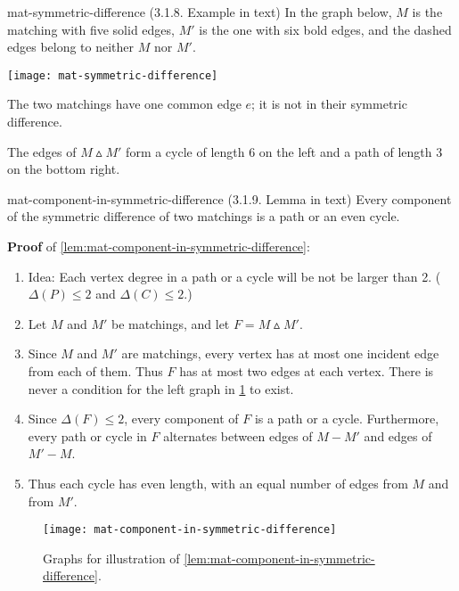 \documentclass[../src/handouts/main.tex]{subfiles}
\begin{document}
\begin{example}{}{mat-symmetric-difference}
  (3.1.8. Example in text)
  In the graph below, $M$ is the matching with five solid edges, $M'$ is the one with six bold edges, and the dashed edges belong to neither $M$ nor $M'$.

  \begin{center}
    \texttt{[image: mat-symmetric-difference]}
  \end{center}

  The two matchings have one common edge $e$; it is not in their symmetric difference.

  The edges of $M \smalltriangleup M'$ form a cycle of length 6 on the left and a path of length 3 on the bottom right.
\end{example}

\begin{lemma}{}{mat-component-in-symmetric-difference}
  (3.1.9. Lemma in text)
  Every component of the symmetric difference of two matchings is a path or an even cycle.
\end{lemma}

\textbf{Proof} of \cref{lem:mat-component-in-symmetric-difference}:
\begin{enumerate}
  \item Idea: Each vertex degree in a path or a cycle will be not be larger than 2. ($\Delta(P) \leq 2$ and $\Delta(C) \leq 2$.)
  \item Let $M$ and $M'$ be matchings, and let $F = M \smalltriangleup M'$.
  \item Since $M$ and $M'$ are matchings, every vertex has at most one incident edge from each of them. Thus $F$ has at most two edges at each vertex. There is never a condition for the left graph in \cref{fig:mat-component-in-symmetric-difference} to exist.
  \item Since $\Delta(F) \leq 2$, every component of $F$ is a path or a cycle. Furthermore, every path or cycle in $F$ alternates between edges of $M - M'$ and edges of $M' - M$.
  \item Thus each cycle has even length, with an equal number of edges from $M$ and from $M'$.
\end{enumerate}

\begin{figure}[htbp]
  \centering
  \texttt{[image: mat-component-in-symmetric-difference]}
  \caption{Graphs for illustration of \cref{lem:mat-component-in-symmetric-difference}.}
  \label{fig:mat-component-in-symmetric-difference}
\end{figure}
\end{document}
